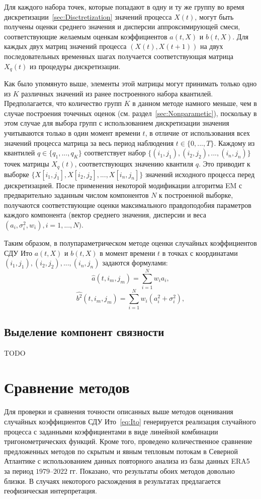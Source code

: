 Для каждого набора точек, которые попадают в одну и ту же группу во время дискретизации~\ref{sec:Disctretization} значений процесса $X(t)$, могут быть получены оценки среднего значения и дисперсии аппроксимирующей смеси, соответствующие желаемым оценкам коэффициентов $a(t,X)$ и $b(t,X)$. Для каждых двух матриц значений процесса $(X(t),X(t+1))$ на двух последовательных временных шагах получается соответствующая матрица $X_q(t)$ из процедуры дискретизации.


Как было упомянуто выше, элементы этой матрицы могут принимать только одно из $K$ различных значений из ранее построенного набора квантилей. Предполагается, что количество групп $K$ в данном методе намного меньше, чем в случае построения точечных оценок (см. раздел~\ref{sec:Nonparametic}), поскольку в этом случае для выбора групп с использованием дискретизации значения учитываются только в один момент времени $t$, в отличие от использования всех значений процесса матрица за весь период наблюдения $t \in \{0,...,T\}$. Каждому из квантилей $q \in \{q_1,..., q_K\}$ соответствует набор $\{(i_1, j_1), (i_2, j_2),..., (i_n, j_n)\}$ точек матрицы $X_q(t)$, соответствующих значению квантиля $q$. Это приводит к выборке $\{X[i_1,j_1 ], X[i_2,j_2 ],...,X[i_n,j_n]\}$ значений исходного процесса перед дискретизацией. После применения некоторой модификации алгоритма EM с предварительно заданным числом компонентов $N$ к построенной выборке, получаются соответствующие оценки максимального правдоподобия параметров каждого компонента (вектор среднего значения, дисперсии и веса $(a_i,\sigma_i^2, w_i), i=1,...,N)$.


Таким образом, в полупараметрическом методе оценки случайных коэффициентов СДУ Ито $a(t, X)$ и $b(t,X)$ в момент времени $t$ в точках с координатами $(i_1, j_1), (i_2,j_2),..., (i_n, j_n)$ задаются формулами:
$$
\hat{a}(t, i_m, j_m) = \sum\limits_{i=1}^N w_i a_i,
$$
$$
\hat{b^2}(t, i_m, j_m) = \sum\limits_{i=1}^N w_i (a_i^2 + \sigma_i^2),
$$
\subsection{Выделение компонент связности}
\label{sec:Components}
TODO \cite{2020_statistical_estimation_Langevin} \cite{gorshenin2020efficiency}



\section{Сравнение методов}
\label{sec:Compare}
Для проверки и сравнения точности описанных выше методов оценивания случайных коэффициентов СДУ Ито~\eqref{eq:Ito} генерируется реализация случайного процесса с заданными коэффициентами в виде линейной комбинации тригонометрических функций. Кроме того, проведено количественное сравнение предложенных методов по скрытым и явным тепловым потокам в Северной Атлантике с использованием данных повторного анализа из базы данных ERA5 за период $1979$--$2022$ гг. Показано, что результаты обоих методов довольно близки. В случаях некоторого расхождения в результатах предлагается геофизическая интерпретация.

